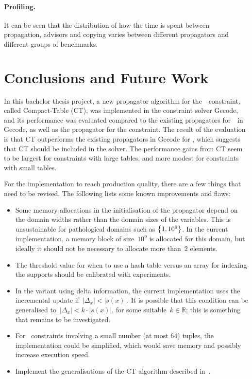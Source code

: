 \documentclass[a4paper,11pt]{article}
\newcommand{\Table}{\Constraint{Table}}
\numberwithin{equation}{section}
\begin{document}
\paragraph{Profiling.}
It can be seen that the distribution of how the time is spent between propagation, advisors
and copying varies between different propagators and different groups of benchmarks.
\section{Conclusions and Future Work}
\label{conclusions}

In this bachelor thesis project, a new propagator algorithm for the~\Table~constraint,
called Compact-Table (CT), was implemented in the constraint solver Gecode, and its performance
was evaluated compared to the existing propagators for~\Table~in Gecode, as well
as the propagator for the  constraint.
The result of the evaluation is that CT outperforms the existing propagators
in Gecode for \Table, which suggests that CT should be included in the solver.
The performance gains from CT seem to be largest for constraints with large tables,
and more modest for constraints with small tables.

For the implementation to reach production quality, there
are a few things that need to be revised. The following lists some known
improvements and flaws:

\begin{itemize}
    
  \item Some memory allocations in the initialisation of the propagator
    depend on the domain widths rather
    than the domain sizes of the variables. This is unsustainable
    for pathological domains such as $\left\{1, 10^9\right\}$. In the current
    implementation, a memory block of size~$10^9$ is allocated for this
    domain, but ideally it should not be necessary to allocate more than~$2$
    elements.

  \item The threshold value for when to use a hash table versus
    an array for indexing the supports should be calibrated with
    experiments.

  \item In the variant using delta information, the current implementation
    uses the incremental update if~$|\Delta_x| < |s(x)|$. It is possible
    that this condition can be generalised to~$|\Delta_x| < k \cdot |s(x)|$,
    for some suitable~$k \in \mathbb{R}$; this is something that remains 
    to be investigated.
    
  \item For \Table~constraints involving a small number (at most $64$)
    tuples, the implementation could be simplified, which would save
    memory and possibly increase execution speed.

  \item Implement the generalisations of the CT algorithm described
    in~\cite{DBLP:conf/aaai/VerhaegheLS17}.

\end{itemize}
\end{document}
